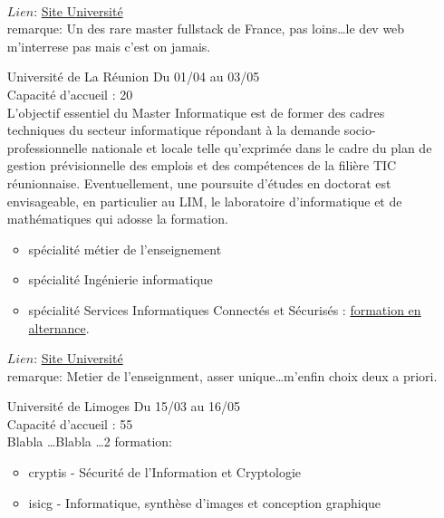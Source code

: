 \documentclass[a4paper,11pt]{article}
\begin{document}
\begin{enumerate}
                \\$Lien$: \href{https://applisweb.universita.corsica/devu/fiches_diplomes/fiches_diplomes-front/index-front.php?rbk=2&profil=&id_site=1&acces=ok&id_art=389&id_rub=162&id_fiche=CST_M_INFORMATIQUE_DEVFULLSTACK}{Site Université}
                \\ remarque: Un des rare master fullstack de France, pas loins\dots le dev web m'interrese pas mais c'est on jamais.
\\
        \item [\color{LightOrangeHaf}Université de La Réunion] Du 01/04 au 03/05
                \\Capacité d'accueil : 20
                \\L'objectif essentiel du Master Informatique est de former des cadres techniques du secteur informatique répondant à la demande socio-professionnelle nationale et locale telle qu'exprimée dans le cadre du plan de gestion prévisionnelle des emplois et des compétences de la filière TIC réunionnaise. Eventuellement, une poursuite d'études en doctorat est envisageable, en particulier au LIM, le laboratoire d'informatique et de mathématiques qui adosse la formation.
                \begin{itemize}
                    \item spécialité métier de l'enseignement
                    \item spécialité Ingénierie informatique
                    \item spécialité Services Informatiques Connectés et Sécurisés : \underline{formation en alternance}.
                \end{itemize}
                $Lien$: \href{https://sciences.univ-reunion.fr/formation/offre-de-formations-2020-2024/masters-2020-2024/informatique}{Site Université}
                \\ remarque: Metier de l'enseignment, asser unique\dots m'enfin choix deux a priori.
\\
        \item [\color{LightOrangeHaf}Université de Limoges] Du 15/03 au 16/05
                \\Capacité d'accueil : 55
                \\Blabla \ldots Blabla \dots 2 formation:
                \begin{itemize}
                    \item cryptis - Sécurité de l’Information et Cryptologie
                    \item isicg - Informatique, synthèse d’images et conception graphique

\end{itemize}
\end{enumerate}
\end{document}
